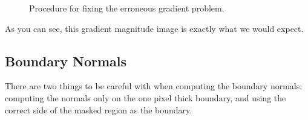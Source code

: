 \documentclass{InsightArticle}
\begin{document}
\begin{figure}[H]
\centering
{}
\caption{Procedure for fixing the erroneous gradient problem.}
\label{fig:ErrorneousGradientCorrection}
\end{figure}

As you can see, this gradient magnitude image is exactly what we would expect.

\subsection{Boundary Normals}
There are two things to be careful with when computing the boundary normals: computing the normals only on the one pixel thick boundary, and using the correct side of the masked region as the boundary.
\end{document}
